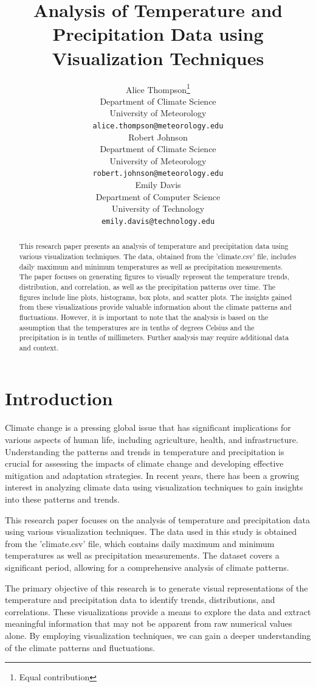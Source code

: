 \documentclass{article}
\title{Analysis of Temperature and Precipitation Data using Visualization Techniques}
\author{
  Alice Thompson\thanks{Equal contribution} \\
  Department of Climate Science\\
  University of Meteorology\\
  \texttt{alice.thompson@meteorology.edu} \\
  \And
  Robert Johnson\footnotemark[1] \\
  Department of Climate Science\\
  University of Meteorology\\
  \texttt{robert.johnson@meteorology.edu} \\
  \And
  Emily Davis \\
  Department of Computer Science\\
  University of Technology\\
  \texttt{emily.davis@technology.edu} \\
}
\begin{document}
\maketitle

\begin{abstract}
This research paper presents an analysis of temperature and precipitation data using various visualization techniques. The data, obtained from the 'climate.csv' file, includes daily maximum and minimum temperatures as well as precipitation measurements. The paper focuses on generating figures to visually represent the temperature trends, distribution, and correlation, as well as the precipitation patterns over time. The figures include line plots, histograms, box plots, and scatter plots. The insights gained from these visualizations provide valuable information about the climate patterns and fluctuations. However, it is important to note that the analysis is based on the assumption that the temperatures are in tenths of degrees Celsius and the precipitation is in tenths of millimeters. Further analysis may require additional data and context.
\end{abstract}

\section{Introduction}

Climate change is a pressing global issue that has significant implications for various aspects of human life, including agriculture, health, and infrastructure. Understanding the patterns and trends in temperature and precipitation is crucial for assessing the impacts of climate change and developing effective mitigation and adaptation strategies. In recent years, there has been a growing interest in analyzing climate data using visualization techniques to gain insights into these patterns and trends.

This research paper focuses on the analysis of temperature and precipitation data using various visualization techniques. The data used in this study is obtained from the 'climate.csv' file, which contains daily maximum and minimum temperatures as well as precipitation measurements. The dataset covers a significant period, allowing for a comprehensive analysis of climate patterns.

The primary objective of this research is to generate visual representations of the temperature and precipitation data to identify trends, distributions, and correlations. These visualizations provide a means to explore the data and extract meaningful information that may not be apparent from raw numerical values alone. By employing visualization techniques, we can gain a deeper understanding of the climate patterns and fluctuations.
\end{document}
